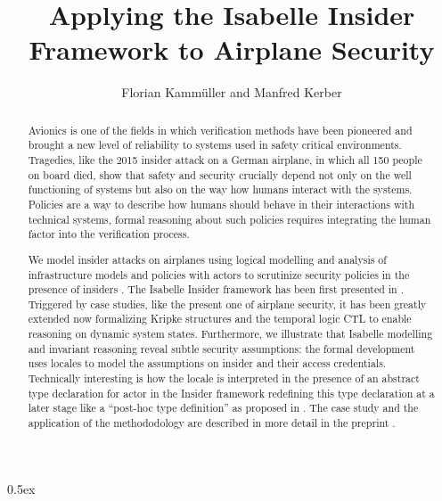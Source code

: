 \documentclass[11pt,a4paper]{article}
\begin{document}
\title{Applying the Isabelle Insider Framework to Airplane Security}
\author{Florian Kamm\"uller and Manfred Kerber}

\maketitle

\begin{abstract}
Avionics is one of the fields in which verification methods have been pioneered 
and brought a new level of reliability to systems used in safety critical 
environments. Tragedies, like the 2015 insider attack on a German airplane, 
in which all 150 people on board died, show that safety and security crucially 
depend not only on the well functioning of systems but also on the way how 
humans interact with the systems. Policies are a way to describe how humans 
should behave in their interactions with technical systems, formal reasoning 
about such policies requires integrating the human factor into the 
verification process.

We model insider attacks on airplanes 
using logical modelling and analysis of infrastructure models 
and policies with actors to scrutinize security policies in the presence of 
insiders \cite{kk:16}. 
The Isabelle Insider framework has been first 
presented in \cite{kp:16}. 
Triggered by case studies, like the present one of airplane security, it 
has been greatly extended now formalizing Kripke structures and the temporal 
logic CTL to enable reasoning on dynamic system states. 
Furthermore, we illustrate that Isabelle modelling and invariant 
reasoning reveal subtle security assumptions: the formal development uses
locales to model the assumptions on insider and their access credentials.
Technically interesting is how the locale is interpreted in the presence
of an abstract type declaration for actor in the Insider framework redefining 
this type declaration at a later stage like a ``post-hoc type definition'' 
as proposed in \cite{mw:09}.
The case study and the application of the methododology are described in more 
detail in the preprint \cite{kk:20}.
\end{abstract}

\tableofcontents

\parindent 0pt\parskip 0.5ex





\end{document}
